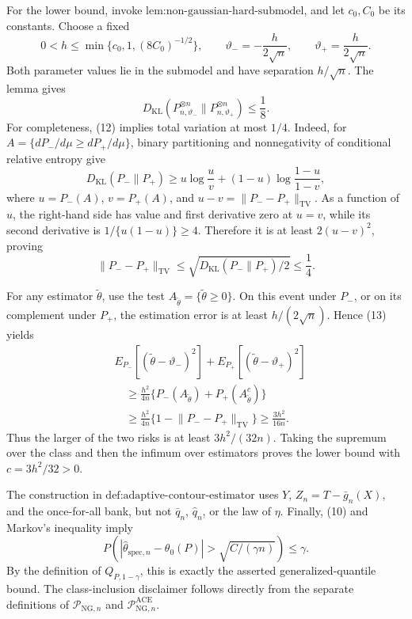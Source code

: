 For the lower bound, invoke \(\text{lem:non-gaussian-hard-submodel}\), and let \(c_0,C_0\) be its constants.  Choose a fixed
\[
 0<h\le\min\{c_0,1,(8C_0)^{-1/2}\},
 \qquad
 \vartheta_-=-\frac{h}{2\sqrt n},
 \qquad
 \vartheta_+=\frac{h}{2\sqrt n}.
\]
Both parameter values lie in the submodel and have separation \(h/\sqrt n\).  The lemma gives
\[
 D_{\mathrm{KL}}(P_{n,\vartheta_-}^{\otimes n}
 \|P_{n,\vartheta_+}^{\otimes n})\le\frac18. \tag{12}
\]
For completeness, (12) implies total variation at most \(1/4\).  Indeed, for \(A=\{dP_-/d\mu\ge dP_+/d\mu\}\), binary partitioning and nonnegativity of conditional relative entropy give
\[
 D_{\mathrm{KL}}(P_-\|P_+)
 \ge u\log\frac uv+(1-u)\log\frac{1-u}{1-v},
\]
where \(u=P_-(A)\), \(v=P_+(A)\), and \(u-v=\lVert P_--P_+\rVert_{\mathrm{TV}}\).  As a function of \(u\), the right-hand side has value and first derivative zero at \(u=v\), while its second derivative is \(1/\{u(1-u)\}\ge4\).  Therefore it is at least \(2(u-v)^2\), proving
\[
 \lVert P_--P_+\rVert_{\mathrm{TV}}
 \le\sqrt{D_{\mathrm{KL}}(P_-\|P_+)/2}\le\frac14. \tag{13}
\]

For any estimator \(\widetilde\theta\), use the test \(A_{\widetilde\theta}=\{\widetilde\theta\ge0\}\).  On this event under \(P_-\), or on its complement under \(P_+\), the estimation error is at least \(h/(2\sqrt n)\).  Hence (13) yields
\[
 \begin{aligned}
 &E_{P_-}[(\widetilde\theta-\vartheta_-)^2]
 +E_{P_+}[(\widetilde\theta-\vartheta_+)^2]\\
 &\quad\ge\frac{h^2}{4n}
 \{P_-(A_{\widetilde\theta})+P_+(A_{\widetilde\theta}^c)\}\\
 &\quad\ge\frac{h^2}{4n}
 \{1-\lVert P_--P_+\rVert_{\mathrm{TV}}\}
 \ge\frac{3h^2}{16n}.
 \end{aligned}
\]
Thus the larger of the two risks is at least \(3h^2/(32n)\).  Taking the supremum over the class and then the infimum over estimators proves the lower bound with \(c=3h^2/32>0\).

The construction in \(\text{def:adaptive-contour-estimator}\) uses \(Y\), \(Z_n=T-\bar g_n(X)\), and the once-for-all bank, but not \(\bar q_n\), \(\widehat q_n\), or the law of \(\eta\).  Finally, (10) and Markov's inequality imply
\[
 P\!\left(
 |\widehat\theta_{\mathrm{spec},n}-\theta_0(P)|
 >\sqrt{C/(\gamma n)}
 \right)\le\gamma.
\]
By the definition of \(Q_{P,1-\gamma}\), this is exactly the asserted generalized-quantile bound.  The class-inclusion disclaimer follows directly from the separate definitions of \(\mathcal P_{\mathrm{NG},n}\) and \(\mathcal P_{\mathrm{NG},n}^{\mathrm{ACE}}\).